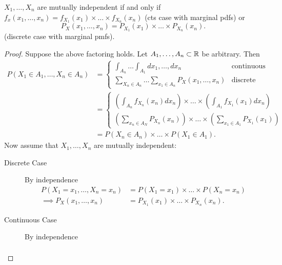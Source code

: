 \begin{theorem}
	$X_{1} , \ldots , X_{n}$ are mutually independent if and only if $f_{x}\left( x_{1} , \ldots , x_{n} \right) = f_{X_{1}}\left( x_1 \right) \times  \ldots\times f_{X_{n}}\left( x_{n} \right) $ (cts case with marginal pdfs) or 
	 \[
		 P_{X}\left( x_{1} , \ldots , x_{n} \right) = P_{X_{1}}\left( x_1 \right) \times \ldots\times P_{X_{n}}\left( x_{n} \right) 
	.\] 
	(discrete case with marginal pmfs).

\begin{proof}
	Suppose the above factoring holds. Let $A_{1} , \ldots , A_{n}\subset \mathbb{R}$ be arbitrary. Then
	\begin{align*}
		P\left( X_1 \in  A_1, \ldots, X_{n} \in  A_{n} \right) &= \begin{cases}
			\int_{A_{n}}^{ } \ldots \int_{A_1}^{ } dx_{1} , \ldots , dx_{n}  & \text{continuous} \\
			\sum\limits_{X_{n} \in  A_{n}} \ldots \sum\limits_{x_1 \in  A_{n}}  P_{X}\left( x_{1} , \ldots , x_{n} \right) & \text{discrete}
		\end{cases}\\
		&= \begin{cases}
			\left( \int_{A_{n}}^{ } f_{X_{n}}\left(x_{n}\right) dx_{n} \right) 	\times \ldots\times \left( \int_{A_{1}}^{ } f_{X_{1}}\left(x_{1}\right) dx_{n} \right) \\
			\left( \sum\limits_{x_{n} \in  A_{N}}^{ } P_{X_{n}}\left( x_{n} \right)  \right) \times  \ldots \times \left( \sum\limits_{x_1 \in  A_1}^{ } P_{X_1}\left( x_1 \right)  \right) 
		\end{cases} \\
		&= P\left( X_{n} \in  A_{n} \right) \times \ldots\times P\left( X_1 \in  A_1 \right) 
	.\end{align*}
	Now assume that $X_{1} , \ldots , X_{n}$ are mutually independent:
	\begin{description}
		\item[Discrete Case] By independence
			\begin{align*}
				P\left( X_{1} = x_1, \ldots, X_{n} = x_{n}\right) &= P\left( X_1 = x_1 \right) \times \ldots\times P\left( X_{n} = x_{n} \right)  \\
				\implies P_{X}\left( x_{1} , \ldots , x_{n} \right) &= P_{X_1}\left( x_1 \right) \times \ldots\times P_{X_{n}}\left( x_{n} \right) 
			.\end{align*}
		\item [Continuous Case] By independence 
			\begin{align*}

\end{align*}
\end{description}
\end{proof}
\end{theorem}
